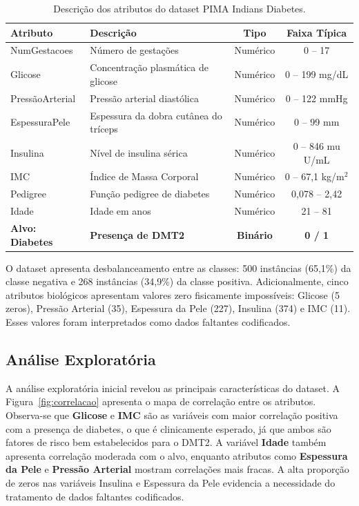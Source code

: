 \documentclass[conference]{IEEEtran}
\begin{document}
\begin{table}[H]
\caption{Descri\c{c}\~ao dos atributos do dataset PIMA Indians Diabetes.}
\label{tab:atributos}
\centering
\scriptsize
\setlength{\tabcolsep}{2pt}
\begin{tabular}{@{}llcc@{}}
\toprule
Atributo & Descri\c{c}\~ao & Tipo & Faixa T\'{i}pica \\
\midrule
NumGestacoes & N\'{u}mero de gesta\c{c}\~oes & Num\'{e}rico & 0 -- 17 \\
Glicose & Concentra\c{c}\~ao plasm\'{a}tica de glicose & Num\'{e}rico & 0 -- 199 mg/dL \\
Press\~aoArterial & Press\~ao arterial diast\'{o}lica & Num\'{e}rico & 0 -- 122 mmHg \\
EspessuraPele & Espessura da dobra cut\^{a}nea do tr\'{i}ceps & Num\'{e}rico & 0 -- 99 mm \\
Insulina & N\'{i}vel de insulina s\'{e}rica & Num\'{e}rico & 0 -- 846 mu U/mL \\
IMC & \'{I}ndice de Massa Corporal & Num\'{e}rico & 0 -- 67,1 kg/m$^2$ \\
Pedigree & Fun\c{c}\~ao pedigree de diabetes & Num\'{e}rico & 0,078 -- 2,42 \\
Idade & Idade em anos & Num\'{e}rico & 21 -- 81 \\
\textbf{Alvo: Diabetes} & \textbf{Presen\c{c}a de DMT2} & \textbf{Bin\'{a}rio} & \textbf{0 / 1} \\
\bottomrule
\end{tabular}
\end{table}

O dataset apresenta desbalanceamento entre as classes: 500 inst\^{a}ncias (65,1\%) da classe negativa e 268 inst\^{a}ncias (34,9\%) da classe positiva. Adicionalmente, cinco atributos biol\'{o}gicos apresentam valores zero fisicamente imposs\'{i}veis: Glicose (5 zeros), Press\~ao Arterial (35), Espessura da Pele (227), Insulina (374) e IMC (11). Esses valores foram interpretados como dados faltantes codificados.

\subsection{An\'{a}lise Explorat\'{o}ria}

A an\'{a}lise explorat\'{o}ria inicial revelou as principais caracter\'{i}sticas do dataset. A Figura~\ref{fig:correlacao} apresenta o mapa de correla\c{c}\~ao entre os atributos. Observa-se que \textbf{Glicose} e \textbf{IMC} s\~ao as vari\'{a}veis com maior correla\c{c}\~ao positiva com a presen\c{c}a de diabetes, o que \'{e} clinicamente esperado, j\'{a} que ambos s\~ao fatores de risco bem estabelecidos para o DMT2. A vari\'{a}vel \textbf{Idade} tamb\'{e}m apresenta correla\c{c}\~ao moderada com o alvo, enquanto atributos como \textbf{Espessura da Pele} e \textbf{Press\~ao Arterial} mostram correla\c{c}\~oes mais fracas. A alta propor\c{c}\~ao de zeros nas vari\'{a}veis Insulina e Espessura da Pele evidencia a necessidade do tratamento de dados faltantes codificados.
\end{document}
